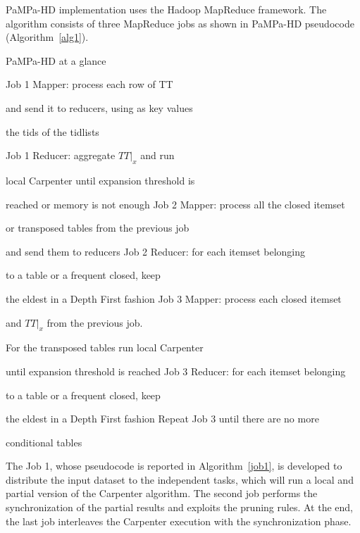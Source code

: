PaMPa-HD implementation uses the Hadoop MapReduce framework.
The algorithm consists of three MapReduce jobs as shown in PaMPa-HD pseudocode
(Algorithm~\ref{alg1}).

\begin{algorithm}[t]
\scriptsize
\centering
\caption{PaMPa-HD at a glance}
 \label{alg1}
 \begin{algorithmic}[1]
\State Job 1 Mapper: process each row of TT \par
and send it to reducers, using as key values \par the tids of the tidlists

\State Job 1 Reducer: aggregate $TT|_{x}$ and run \par local Carpenter until
expansion threshold is \par reached  or memory is not enough
\State Job 2 Mapper: process all the closed itemset \par or transposed
 tables from the previous job \par and send them to reducers
\State Job 2 Reducer: for each itemset belonging \par to a table or a frequent
closed, keep \par the eldest in  a Depth First fashion
\State Job 3 Mapper: process each closed itemset \par and $TT|_{x}$ from  the
previous job. \par For the transposed tables run
local Carpenter \par until  expansion  threshold is reached
\State Job 3 Reducer: for each itemset belonging \par to a table or a frequent
closed, keep \par the eldest in  a Depth First fashion
\State Repeat Job 3 until there are no more \par conditional tables

 \EndProcedure
 \end{algorithmic}
\end{algorithm}



The Job 1, whose pseudocode is reported in Algorithm~\ref{job1},
 is developed to distribute the input dataset to the independent
tasks,
which will run a local and partial version of the Carpenter algorithm. 
The second job performs the synchronization of the partial results and 
exploits the pruning rules. At the end, the last job interleaves the Carpenter
execution with the synchronization phase.\\


